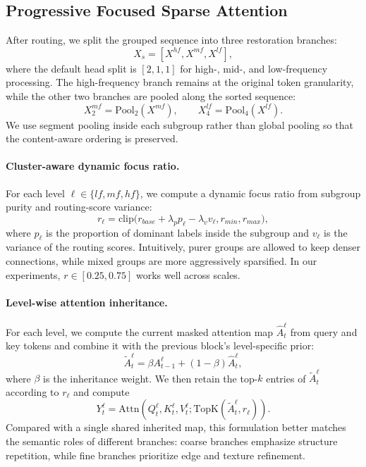 \subsection{Progressive Focused Sparse Attention}
After routing, we split the grouped sequence into three restoration branches:
\begin{equation}
X_s = [X^{hf}, X^{mf}, X^{lf}],
\end{equation}
where the default head split is \([2,1,1]\) for high-, mid-, and low-frequency processing. The high-frequency branch remains at the original token granularity, while the other two branches are pooled along the sorted sequence:
\begin{equation}
X^{mf}_2 = \mathrm{Pool}_2(X^{mf}), \qquad
X^{lf}_4 = \mathrm{Pool}_4(X^{lf}).
\end{equation}
We use segment pooling inside each subgroup rather than global pooling so that the content-aware ordering is preserved.

\paragraph{Cluster-aware dynamic focus ratio.}
For each level \(\ell \in \{lf,mf,hf\}\), we compute a dynamic focus ratio from subgroup purity and routing-score variance:
\begin{equation}
r_{\ell} = \mathrm{clip}\bigl(r_{base} + \lambda_p p_{\ell} - \lambda_v v_{\ell}, r_{min}, r_{max}\bigr),
\end{equation}
where \(p_{\ell}\) is the proportion of dominant labels inside the subgroup and \(v_{\ell}\) is the variance of the routing scores. Intuitively, purer groups are allowed to keep denser connections, while mixed groups are more aggressively sparsified. In our experiments, \(r \in [0.25, 0.75]\) works well across scales.

\paragraph{Level-wise attention inheritance.}
For each level, we compute the current masked attention map \(\hat{A}^{\ell}_t\) from query and key tokens and combine it with the previous block's level-specific prior:
\begin{equation}
\tilde{A}^{\ell}_t = \beta A^{\ell}_{t-1} + (1-\beta)\hat{A}^{\ell}_t,
\end{equation}
where \(\beta\) is the inheritance weight. We then retain the top-\(k\) entries of \(\tilde{A}^{\ell}_t\) according to \(r_{\ell}\) and compute
\begin{equation}
Y^{\ell}_t = \mathrm{Attn}(Q^{\ell}_t, K^{\ell}_t, V^{\ell}_t; \mathrm{TopK}(\tilde{A}^{\ell}_t, r_{\ell})).
\end{equation}
Compared with a single shared inherited map, this formulation better matches the semantic roles of different branches: coarse branches emphasize structure repetition, while fine branches prioritize edge and texture refinement.

